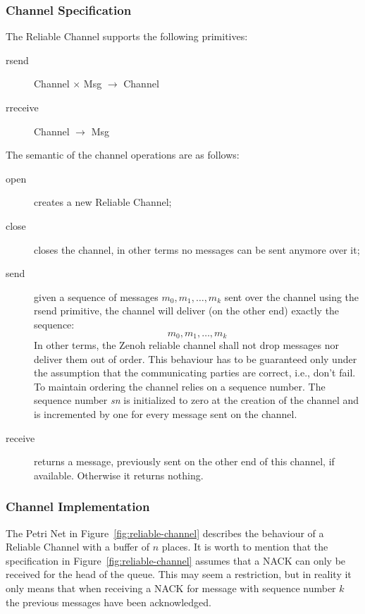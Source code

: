 \documentclass[a4paper,oneside,article]{memoir}
\begin{document}
\subsubsection{Channel Specification}
The Reliable Channel supports the following primitives:
\begin{description}
\item[rsend] Channel $\times$ Msg $\rightarrow$ Channel
\item[rreceive] Channel $\rightarrow$ Msg
\end{description}
The semantic of the channel operations are as follows:
\begin{description}
\item[open] creates a new Reliable Channel;
\item[close] closes the channel, in other terms no messages can be sent anymore over it;
\item[send] given a sequence of messages $m_0, m_1, \ldots{}, m_k$ sent over the channel using the
  rsend primitive, the channel will deliver (on the other end) exactly the sequence:
  \[
    m_0, m_1, \ldots{}, m_k
  \]
  In other terms, the Zenoh reliable channel shall not drop messages nor deliver them out of order.
  This behaviour has to be guaranteed only under the assumption that the communicating parties are
  correct, i.e., don't fail.  To maintain ordering the channel relies on a sequence number.  The
  sequence number \emph{sn} is initialized to zero at the creation of the channel and is incremented
  by one for every message sent on the channel.
\item[receive] returns a message, previously sent on the other end of this channel, if
  available.  Otherwise it returns nothing.
\end{description}  

\subsubsection{Channel Implementation}

The Petri Net in Figure~\ref{fig:reliable-channel} describes the behaviour of a Reliable Channel
with a buffer of $n$ places.  It is worth to mention that the specification in
Figure~\ref{fig:reliable-channel} assumes that a NACK can only be received for the head of the
queue.  This may seem a restriction, but in reality it only means that when receiving a NACK for
message with sequence number $k$ the previous messages have been acknowledged.
\end{document}
